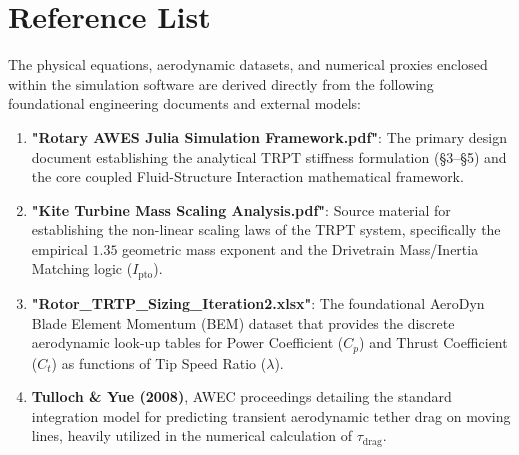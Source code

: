 \documentclass[11pt,a4paper]{article}
\begin{document}
\section{Reference List}
The physical equations, aerodynamic datasets, and numerical proxies enclosed within the simulation software are derived directly from the following foundational engineering documents and external models:
\begin{enumerate}
    \item \textbf{"Rotary AWES Julia Simulation Framework.pdf"}: The primary design document establishing the analytical TRPT stiffness formulation (§3–§5) and the core coupled Fluid-Structure Interaction mathematical framework.
    \item \textbf{"Kite Turbine Mass Scaling Analysis.pdf"}: Source material for establishing the non-linear scaling laws of the TRPT system, specifically the empirical $1.35$ geometric mass exponent and the Drivetrain Mass/Inertia Matching logic ($I_{\text{pto}}$).
    \item \textbf{"Rotor\_TRTP\_Sizing\_Iteration2.xlsx"}: The foundational AeroDyn Blade Element Momentum (BEM) dataset that provides the discrete aerodynamic look-up tables for Power Coefficient ($C_p$) and Thrust Coefficient ($C_t$) as functions of Tip Speed Ratio ($\lambda$).
    \item \textbf{Tulloch \& Yue (2008)}, AWEC proceedings detailing the standard integration model for predicting transient aerodynamic tether drag on moving lines, heavily utilized in the numerical calculation of $\tau_{\text{drag}}$.
\end{enumerate}
\end{document}
